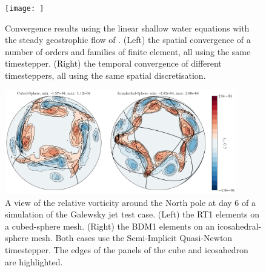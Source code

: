 \documentclass[journal abbreviation, manuscript]{copernicus}
\begin{document}
\begin{figure}[htp!]
\centering
\texttt{[image: ]}
\caption{Convergence results using the linear shallow water equations with the steady geostrophic flow of \citet{williamson1992standard}.
(Left) the spatial convergence of a number of orders and families of finite element, all using the same timestepper. (Right) the temporal convergence of different timesteppers, all using the same spatial discretisation.}
\label{fig:sw_convergence}
\end{figure}

\begin{figure}[htp!]
\centering
\includegraphics[width=0.9\textwidth]{figures/galewsky_jet.png}
\caption{A view of the relative vorticity around the North pole at day 6 of a simulation of the Galewsky jet test case. (Left) the RT1 elements on a cubed-sphere mesh. (Right) the BDM1 elements on an icosahedral-sphere mesh. Both cases use the Semi-Implicit Quasi-Newton timestepper. The edges of the panels of the cube and icosahedron are highlighted.}
\label{fig:galewsky}
\end{figure}
\end{document}
